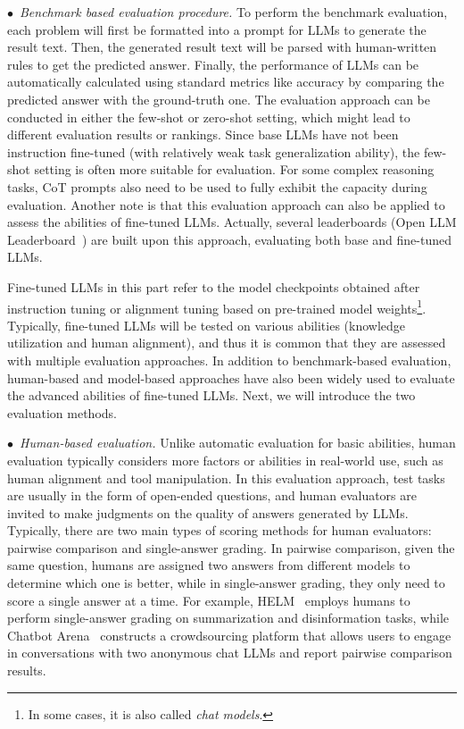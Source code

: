 $\bullet$~\emph{Benchmark based evaluation procedure.}
To perform the benchmark evaluation, each problem will first be formatted into a prompt for LLMs to generate the result text.
Then, the generated result text will be parsed with human-written rules to get the predicted answer.
Finally, the performance of LLMs can be automatically calculated using standard metrics like accuracy by comparing the predicted answer with the ground-truth one.
The evaluation approach can be conducted in either the few-shot or zero-shot setting, which might lead to different evaluation results or rankings.
Since base LLMs have not been instruction fine-tuned (with relatively weak task generalization ability), the few-shot setting is often more suitable for evaluation.
For some complex reasoning tasks, CoT prompts also need to be used to fully exhibit the capacity during evaluation.
Another note is that this evaluation approach can also be applied to assess the abilities of fine-tuned LLMs.
Actually, several leaderboards (\eg Open LLM Leaderboard~\cite{Edward-2023-hf-open}) are built upon this approach, evaluating both base and fine-tuned LLMs.

Fine-tuned LLMs in this part refer to the model checkpoints obtained after instruction tuning or alignment tuning based on pre-trained model weights\footnote{In some cases, it is also called \emph{chat models}.}.
Typically, fine-tuned LLMs will be tested on various abilities (\eg knowledge utilization and human alignment), and thus it is common that they are assessed with multiple evaluation approaches.
In addition to benchmark-based evaluation, human-based and model-based approaches have also been widely used to evaluate the advanced abilities of fine-tuned LLMs.
Next, we will introduce the two evaluation methods.

$\bullet$~\emph{Human-based evaluation.}
Unlike automatic evaluation for basic abilities, human evaluation typically considers more factors or abilities  in real-world use, such as human alignment and tool manipulation.
In this evaluation approach, test tasks are usually in the form of open-ended questions, and human evaluators are invited to  make judgments on the quality of answers generated by LLMs.
Typically, there are two main types of scoring methods for human evaluators: pairwise comparison and single-answer grading.
In pairwise comparison, given the same question, humans are assigned two answers from different models to determine which one is better, while in single-answer grading, they only need to score a single answer at a time.
For example, HELM~\cite{Liang-arxiv-2022-Holistic} employs humans to perform single-answer grading on summarization and disinformation tasks, while Chatbot Arena~\cite{Zheng-2023-arxiv-Judging} constructs a crowdsourcing platform that allows users to engage in conversations with two anonymous chat LLMs and report pairwise comparison results.

